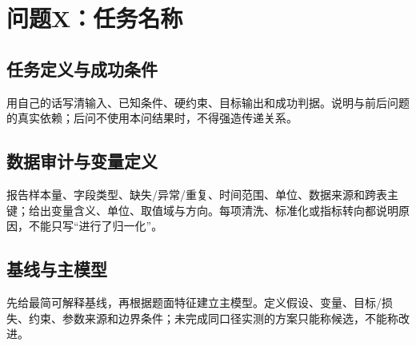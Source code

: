 \section{问题X：任务名称}


\subsection{任务定义与成功条件}

用自己的话写清输入、已知条件、硬约束、目标输出和成功判据。说明与前后问题的真实依赖；后问不使用本问结果时，不得强造传递关系。

\subsection{数据审计与变量定义}

报告样本量、字段类型、缺失/异常/重复、时间范围、单位、数据来源和跨表主键；给出变量含义、单位、取值域与方向。每项清洗、标准化或指标转向都说明原因，不能只写“进行了归一化”。

\subsection{基线与主模型}

先给最简可解释基线，再根据题面特征建立主模型。定义假设、变量、目标/损失、约束、参数来源和边界条件；未完成同口径实测的方案只能称候选，不能称改进。

